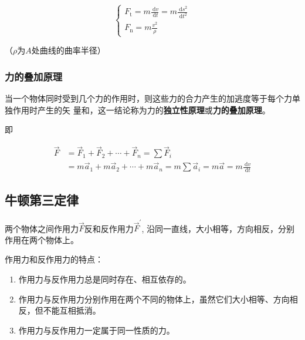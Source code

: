 \documentclass[12pt, a4paper]{article}
\numberwithin{equation}{section}
\begin{document}
    \begin{equation}
        \left\{\begin{array}{l}
        F_{\mathrm{t}}=m \frac{\mathrm{~d} v}{\mathrm{~d} t}=m \frac{\mathrm{~d} s^2}{\mathrm{~d} t^2} \\
        F_{\mathrm{n}}=m \frac{v^2}{\rho}
        \end{array}\right.
    \end{equation}

    （\(\rho\)为\(A\)处曲线的曲率半径）

\subsubsection{力的叠加原理}

    当一个物体同时受到几个力的作用时，则这些力的合力产生的加逃度等于每个力单独作用时产生的矢
    量和，这一结论称为力的\textbf{独立性原理}或\textbf{力的叠加原理}。

    即

    \begin{equation}
        \begin{aligned}
        \overrightarrow{F} & =\overrightarrow{F}_1+\overrightarrow{F}_2+\cdots+\overrightarrow{F}_n=\sum \overrightarrow{F}_i \\
        & =m \overrightarrow{a}_1+m \overrightarrow{a}_2+\cdots+m \overrightarrow{a}_n=m \sum \overrightarrow{a}_i=m \overrightarrow{a}=m \frac{\mathrm{~d} v}{\mathrm{~d} t}
        \end{aligned}
    \end{equation}

\subsection{牛顿第三定律}

    两个物体之间作用力\(\overrightarrow{F}\)反和反作用力\(\overrightarrow{F}^{'}\), 
    沿同一直线，大小相等，方向相反，分别作用在两个物体上。

    作用力和反作用力的特点：

    \begin{enumerate}
        \item 作用力与反作用力总是同时存在、相互依存的。
        \item 作用力与反作用力分别作用在两个不同的物体上，虽然它们大小相等、方向相反，但不能互相抵消。
        \item 作用力与反作用力一定属于同一性质的力。
    \end{enumerate}
\end{document}
